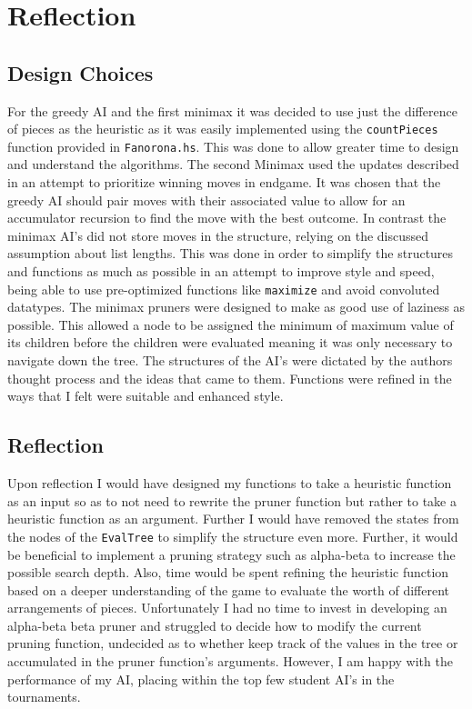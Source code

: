 \documentclass[11pt]{article}
\begin{document}
\newpage
\section{Reflection}
  \subsection{Design Choices}
  For the greedy AI and the first minimax it was decided to use just the difference of pieces as the heuristic as it was easily implemented using the \verb|countPieces| function provided in \verb|Fanorona.hs|. This was done to allow greater time to design and understand the algorithms. The second Minimax used the updates described in an attempt to prioritize winning moves in endgame. It was chosen that the greedy AI should pair moves with their associated value to allow for an accumulator recursion to find the move with the best outcome. In contrast the minimax AI's did not store moves in the structure, relying on the discussed assumption about list lengths. This was done in order to simplify the structures and functions as much as possible in an attempt to improve style and speed, being able to use pre-optimized functions like \verb|maximize| and avoid convoluted datatypes. The minimax pruners were designed to make as good use of laziness as possible. This allowed a node to be assigned the minimum of maximum value of its children before the children were evaluated meaning it was only necessary to navigate down the tree. The structures of the AI's were dictated by the authors thought process and the ideas that came to them. Functions were refined in the ways that I felt were suitable and enhanced style.

  \subsection{Reflection}
  Upon reflection I would have designed my functions to take a heuristic function as an input so as to not need to rewrite the pruner function but rather to take a heuristic function as an argument. Further I would have removed the states from the nodes of the \verb|EvalTree| to simplify the structure even more. Further, it would be beneficial to implement a pruning strategy such as alpha-beta to increase the possible search depth. Also, time would be spent refining the heuristic function based on a deeper understanding of the game to evaluate the worth of different arrangements of pieces. Unfortunately I had no time to invest in developing an alpha-beta beta pruner and struggled to decide how to modify the current pruning function, undecided as to whether keep track of the values in the tree or accumulated in the pruner function's arguments. However, I am happy with the performance of my AI, placing within the top few student AI's in the tournaments.





\end{document}
